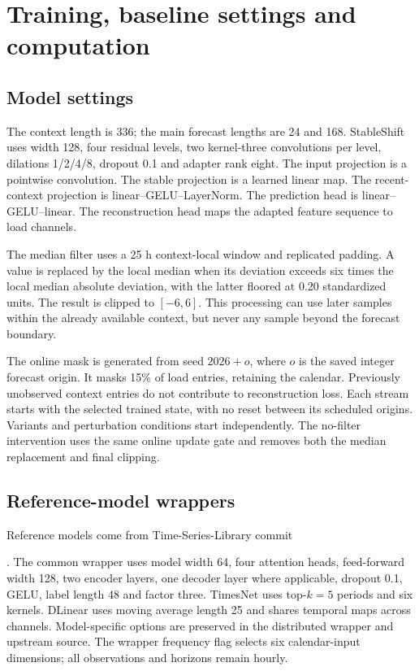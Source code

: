 \documentclass[11pt,a4paper]{article}
\begin{document}
\section{Training, baseline settings and computation}
\subsection{Model settings}
The context length is 336; the main forecast lengths are 24 and 168. StableShift uses width 128, four residual levels, two kernel-three convolutions per level, dilations 1/2/4/8, dropout 0.1 and adapter rank eight. The input projection is a pointwise convolution. The stable projection is a learned linear map. The recent-context projection is linear--GELU--LayerNorm. The prediction head is linear--GELU--linear. The reconstruction head maps the adapted feature sequence to load channels.

The median filter uses a 25 h context-local window and replicated padding. A value is replaced by the local median when its deviation exceeds six times the local median absolute deviation, with the latter floored at 0.20 standardized units. The result is clipped to $[-6,6]$. This processing can use later samples within the already available context, but never any sample beyond the forecast boundary.

The online mask is generated from seed $2026+o$, where $o$ is the saved integer forecast origin. It masks 15\% of load entries, retaining the calendar. Previously unobserved context entries do not contribute to reconstruction loss. Each stream starts with the selected trained state, with no reset between its scheduled origins. Variants and perturbation conditions start independently. The no-filter intervention uses the same online update gate and removes both the median replacement and final clipping.

\subsection{Reference-model wrappers}
Reference models come from Time-Series-Library commit\par
{\footnotesize\ttfamily{}}.
The common wrapper uses model width 64, four attention heads, feed-forward width 128, two encoder layers, one decoder layer where applicable, dropout 0.1, GELU, label length 48 and factor three. TimesNet uses top-$k=5$ periods and six kernels. DLinear uses moving average length 25 and shares temporal maps across channels. Model-specific options are preserved in the distributed wrapper and upstream source. The wrapper frequency flag selects six calendar-input dimensions; all observations and horizons remain hourly.
\end{document}
